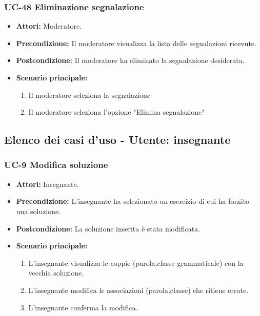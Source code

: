 \subsubsection{UC-48 Eliminazione segnalazione}
\begin{itemize}
	\item \textbf{Attori:} Moderatore.
	\item \textbf{Precondizione:} Il moderatore visualizza la lista delle segnalazioni ricevute.
	\item \textbf{Postcondizione:} Il moderatore ha eliminato la segnalazione desiderata.
	\item \textbf{Scenario principale:}
	\begin{enumerate}
		\item Il moderatore seleziona la segnalazione
		\item Il moderatore seleziona l'opzione "Elimina segnalazione"
	\end{enumerate}
\end{itemize}

\subsection{Elenco dei casi d'uso - Utente: insegnante}		
\subsubsection{UC-9 Modifica soluzione}
\begin{itemize}
\item \textbf{Attori:} Insegnante.
\item \textbf{Precondizione:} L'insegnante ha selezionato un esercizio di cui ha fornito una soluzione.
\item \textbf{Postcondizione:} La soluzione inserita è stata modificata.
\item \textbf{Scenario principale:}
		\begin{enumerate}
		\item L'insegnante visualizza le coppie (parola,classe grammaticale) con la vecchia soluzione.
		\item L'insegnante modifica le associazioni (parola,classe) che ritiene errate.
		\item L'insegnante conferma la modifica.
		\end{enumerate}
\end{itemize}

